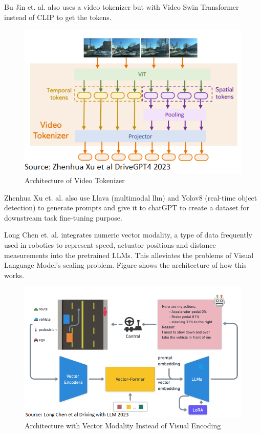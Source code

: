 \begin{spacing}{1.5}
\begin{sloppypar}
Bu Jin et. al. \cite{jin2023adapt} also uses a video tokenizer but with Video Swin Transformer instead of CLIP to get the tokens.   

\begin{figure}[h]
\begin{center}
\includegraphics[scale=0.8]{2/DriveGPT4_1.png}
\caption{Architecture of Video Tokenizer}
\label{fig:driveGPT4}
\end{center}
\end{figure}

Zhenhua Xu et. al. \cite{xu2023drivegpt4} also use Llava (multimodal llm) and Yolov8 (real-time object detection) to generate prompts and give it to chatGPT to create a dataset for downstream task fine-tuning purpose. 

Long Chen et. al. \cite{chen2023driving} integrates numeric vector modality, a type of data frequently used in robotics to represent speed, actuator positions and distance measurements into the pretrained LLMs. This alleviates the problems of Visual Language Model's scaling problem. Figure shows the architecture of how this works.


\begin{figure}[h]
\begin{center}
\includegraphics[scale=0.8]{2/vectorFusion.png}
\caption{Architecture with Vector Modality Instead of Visual Encoding}
\label{fig:vector}
\end{center}
\end{figure}



\end{sloppypar}
\end{spacing}
